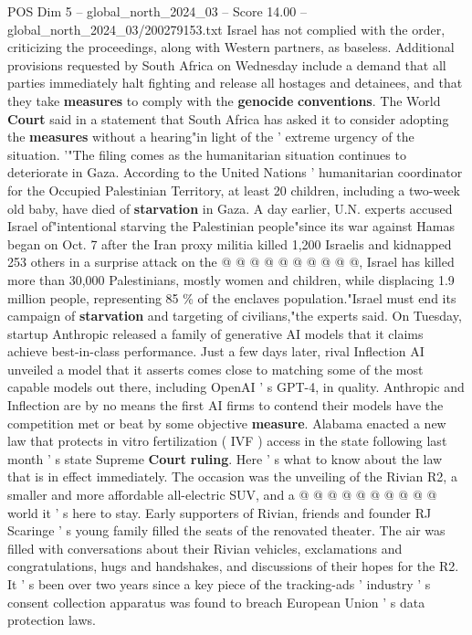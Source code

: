 \begin{textsample}{POS Dim 5 – global\_north\_2024\_03 – Score 14.00 – global\_north\_2024\_03/200279153.txt}
Israel has not complied with the order, criticizing the proceedings, along with Western partners, as baseless.
Additional provisions requested by South Africa on Wednesday include a demand that all parties immediately halt fighting and release all hostages and detainees, and that they take \textbf{measures} to comply with the \textbf{genocide} \textbf{conventions}.
The World \textbf{Court} said in a statement that South Africa has asked it to consider adopting the \textbf{measures} without a hearing"in light of the ' extreme urgency of the situation. '"The filing comes as the humanitarian situation continues to deteriorate in Gaza.
According to the United Nations ' humanitarian coordinator for the Occupied Palestinian Territory, at least 20 children, including a two-week old baby, have died of \textbf{starvation} in Gaza.
A day earlier, U.N. experts accused Israel of"intentional starving the Palestinian people"since its war against Hamas began on Oct. 7 after the Iran proxy militia killed 1,200 Israelis and kidnapped 253 others in a surprise attack on the @ @ @ @ @ @ @ @ @ @, Israel has killed more than 30,000 Palestinians, mostly women and children, while displacing 1.9 million people, representing 85 \% of the enclaves population."Israel must end its campaign of \textbf{starvation} and targeting of civilians,"the experts said.
On Tuesday, startup Anthropic released a family of generative AI models that it claims achieve best-in-class performance.
Just a few days later, rival Inflection AI unveiled a model that it asserts comes close to matching some of the most capable models out there, including OpenAI ' s GPT-4, in quality.
Anthropic and Inflection are by no means the first AI firms to contend their models have the competition met or beat by some objective \textbf{measure}.
Alabama enacted a new law that protects in vitro fertilization ( IVF ) access in the state following last month ' s state Supreme \textbf{Court} \textbf{ruling}.
Here ' s what to know about the law that is in effect immediately.
The occasion was the unveiling of the Rivian R2, a smaller and more affordable all-electric SUV, and a @ @ @ @ @ @ @ @ @ @ world it ' s here to stay.
Early supporters of Rivian, friends and founder RJ Scaringe ' s young family filled the seats of the renovated theater.
The air was filled with conversations about their Rivian vehicles, exclamations and congratulations, hugs and handshakes, and discussions of their hopes for the R2.
It ' s been over two years since a key piece of the tracking-ads ' industry ' s consent collection apparatus was found to breach European Union ' s data protection laws.

\end{textsample}
